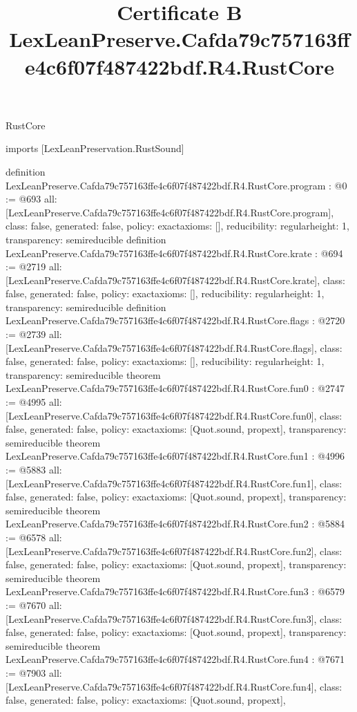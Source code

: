 \begin{lexlean}{RustCore}
\title{Certificate B LexLeanPreserve.Cafda79c757163ffe4c6f07f487422bdf.R4.RustCore}
\begin{coremodule}
imports [LexLeanPreservation.RustSound]

definition LexLeanPreserve.Cafda79c757163ffe4c6f07f487422bdf.R4.RustCore.program : @0 := @693 {
  all: [LexLeanPreserve.Cafda79c757163ffe4c6f07f487422bdf.R4.RustCore.program],
  class: false,
  generated: false,
  policy: exact{axioms: []},
  reducibility: regular{height: 1},
  transparency: semireducible
}
definition LexLeanPreserve.Cafda79c757163ffe4c6f07f487422bdf.R4.RustCore.krate : @694 := @2719 {
  all: [LexLeanPreserve.Cafda79c757163ffe4c6f07f487422bdf.R4.RustCore.krate],
  class: false,
  generated: false,
  policy: exact{axioms: []},
  reducibility: regular{height: 1},
  transparency: semireducible
}
definition LexLeanPreserve.Cafda79c757163ffe4c6f07f487422bdf.R4.RustCore.flags : @2720 := @2739 {
  all: [LexLeanPreserve.Cafda79c757163ffe4c6f07f487422bdf.R4.RustCore.flags],
  class: false,
  generated: false,
  policy: exact{axioms: []},
  reducibility: regular{height: 1},
  transparency: semireducible
}
theorem LexLeanPreserve.Cafda79c757163ffe4c6f07f487422bdf.R4.RustCore.fun0 : @2747 := @4995 {
  all: [LexLeanPreserve.Cafda79c757163ffe4c6f07f487422bdf.R4.RustCore.fun0],
  class: false,
  generated: false,
  policy: exact{axioms: [Quot.sound, propext]},
  transparency: semireducible
}
theorem LexLeanPreserve.Cafda79c757163ffe4c6f07f487422bdf.R4.RustCore.fun1 : @4996 := @5883 {
  all: [LexLeanPreserve.Cafda79c757163ffe4c6f07f487422bdf.R4.RustCore.fun1],
  class: false,
  generated: false,
  policy: exact{axioms: [Quot.sound, propext]},
  transparency: semireducible
}
theorem LexLeanPreserve.Cafda79c757163ffe4c6f07f487422bdf.R4.RustCore.fun2 : @5884 := @6578 {
  all: [LexLeanPreserve.Cafda79c757163ffe4c6f07f487422bdf.R4.RustCore.fun2],
  class: false,
  generated: false,
  policy: exact{axioms: [Quot.sound, propext]},
  transparency: semireducible
}
theorem LexLeanPreserve.Cafda79c757163ffe4c6f07f487422bdf.R4.RustCore.fun3 : @6579 := @7670 {
  all: [LexLeanPreserve.Cafda79c757163ffe4c6f07f487422bdf.R4.RustCore.fun3],
  class: false,
  generated: false,
  policy: exact{axioms: [Quot.sound, propext]},
  transparency: semireducible
}
theorem LexLeanPreserve.Cafda79c757163ffe4c6f07f487422bdf.R4.RustCore.fun4 : @7671 := @7903 {
  all: [LexLeanPreserve.Cafda79c757163ffe4c6f07f487422bdf.R4.RustCore.fun4],
  class: false,
  generated: false,
  policy: exact{axioms: [Quot.sound, propext]},
}
\end{coremodule}
\end{lexlean}
